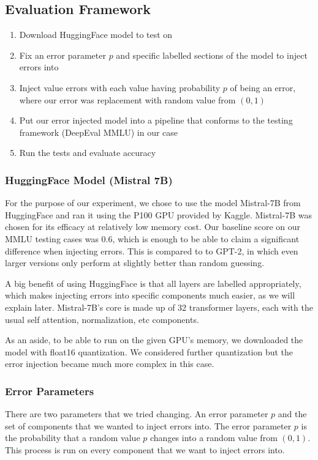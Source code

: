 \subsection{Evaluation Framework}
\begin{enumerate}
    \item Download HuggingFace model to test on
    \item Fix an error parameter $p$ and specific labelled sections of the model to inject errors into
    \item Inject value errors with each value having probability $p$ of being an error, where our error was replacement with random value from $(0, 1)$
    \item Put our error injected model into a pipeline that conforms to the testing framework (DeepEval MMLU) in our case
    \item Run the tests and evaluate accuracy
\end{enumerate}

\subsubsection{HuggingFace Model (Mistral 7B)}
For the purpose of our experiment, we chose to use the model Mistral-7B \cite{jiang2023mistral7b} from HuggingFace and ran it using the P100 GPU provided by Kaggle.
Mistral-7B was chosen for its efficacy at relatively low memory cost. Our baseline score on our MMLU testing cases was 0.6, which is enough to be able to claim a significant difference
when injecting errors. This is compared to to GPT-2, in which even larger versions only perform at slightly better than random guessing.

A big benefit of using HuggingFace is that all layers are labelled appropriately, which makes injecting errors into specific components much easier, as we will explain later. Mistral-7B's core is made up of
32 transformer layers, each with the usual self attention, normalization, etc components.

As an aside, to be able to run on the given GPU's memory, we downloaded the model with float16 quantization. We considered further quantization but
the error injection became much more complex in this case.

\subsubsection{Error Parameters}
There are two parameters that we tried changing. An error parameter $p$ and the set of components that we wanted to inject errors into. The error parameter $p$
is the probability that a random value $p$ changes into a random value from $(0, 1)$. This process is run on every component that we want to inject errors into.


